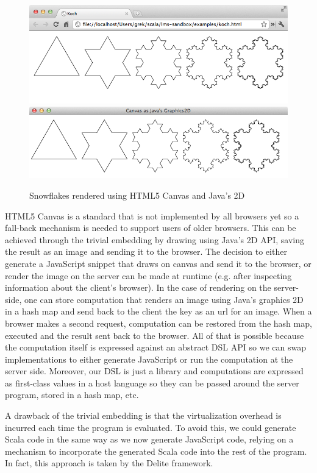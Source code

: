 \documentclass[runningheads,a4paper]{llncs}
\begin{document}
\begin{figure}
\centering
\includegraphics[scale=0.4]{koch-browser}
\includegraphics[scale=0.4]{koch-java2d}
\caption{Snowflakes rendered using HTML5 Canvas and Java's 2D}
\label{fig:snowflakes}
\end{figure}

HTML5 Canvas is a standard that is not implemented by all browsers yet so a fall-back mechanism is needed to support users of older browsers. This can be achieved through the trivial embedding by drawing using Java's 2D API, saving the result as an image and sending it to the browser. The decision to either generate a JavaScript snippet that draws on canvas and send it to the browser, or render the image on the server can be made at runtime (e.g. after inspecting information about the client's browser). In the case of rendering on the server-side, one can store computation that renders an image using Java's graphics 2D in a hash map and send back to the client the key as an url for an image. When a browser makes a second request, computation can be restored from the hash map, executed and the result sent back to the browser. All of that is possible because the computation itself is expressed against an abstract DSL API so we can swap implementations to either generate JavaScript or run the computation at the server side. Moreover, our DSL is just a library and computations are expressed as first-class values in a host language so they can be passed around the server program, stored in a hash map, etc.

A drawback of the trivial embedding is that the virtualization overhead is incurred each time the program is evaluated. To avoid this, we could generate Scala code in the same way as we now generate JavaScript code, relying on a mechanism to incorporate the generated Scala code into the rest of the program. In fact, this approach is taken by the Delite framework.
\end{document}
